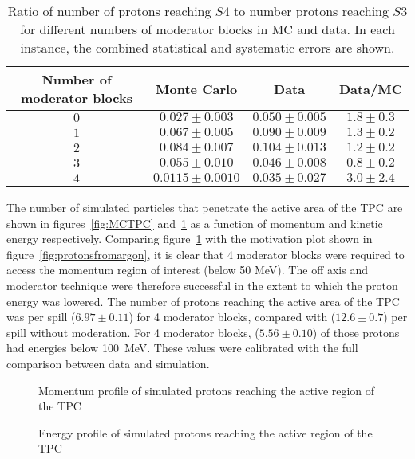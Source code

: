 \begin{table}
  \centering
  \caption{Ratio of number of protons reaching $\mathit{S4}$ to number protons reaching $\mathit{S3}$ for different numbers of moderator blocks in MC and data. In each instance, the combined statistical and systematic errors are shown.}
  \begin{tabular}{|c|c|c|c|}
    \hline 
    Number of moderator blocks & Monte Carlo & Data & Data/MC\\
    \hline
    $0$ & $0.027 \pm 0.003$ & $0.050 \pm 0.005$ & $1.8 \pm 0.3$ \\
    $1$ & $0.067 \pm 0.005$ & $0.090 \pm 0.009$ & $1.3 \pm 0.2$ \\
    $2$ & $0.084 \pm 0.007$ & $0.104 \pm 0.013$ & $1.2 \pm 0.2$ \\
    $3$ & $0.055 \pm 0.010$ & $0.046 \pm 0.008$ & $0.8 \pm 0.2$ \\
    $4$ & $0.0115 \pm 0.0010$ & $0.035 \pm 0.027$ & $3.0 \pm 2.4$ \\
    \hline
  \end{tabular}
  \label{tab:ratios}
\end{table}

The number of simulated particles that penetrate the active area of the TPC are shown in figures~\ref{fig:MCTPC} and~\ref{fig:MCKE} as a function of momentum and kinetic energy respectively.
Comparing figure~\ref{fig:MCKE} with the motivation plot shown in figure~\ref{fig:protonsfromargon}, it is clear that 4 moderator blocks were required to access the momentum region of interest (below 50 MeV).
The off axis and moderator technique were therefore successful in the extent to which the proton energy was lowered.
The number of protons reaching the active area of the TPC was  per spill ($6.97 \pm  0.11$) for 4 moderator blocks, compared with ($12.6 \pm 0.7$) per spill without moderation. 
For 4 moderator blocks, ($5.56 \pm  0.10$) of those protons had energies below 100~MeV.
These values were calibrated with the full comparison between data and simulation.

\begin{figure}[!ht]
  \begin{minipage}[t]{0.48\textwidth}
    \begin{adjustbox}{max totalsize={\textwidth}{.35\textheight}, center}
      
    \end{adjustbox}
    \caption{Momentum profile of simulated protons reaching the active region of the TPC}
    \label{fig:MCTPC}
  \end{minipage}
  \hspace{0.3cm}
  \begin{minipage}[t]{0.48\textwidth}
    \begin{adjustbox}{max totalsize={\textwidth}{.35\textheight}, center}
      
    \end{adjustbox}
    \caption{Energy profile of simulated protons reaching the active region of the TPC}
    \label{fig:MCKE}
  \end{minipage}	
\end{figure}
    
